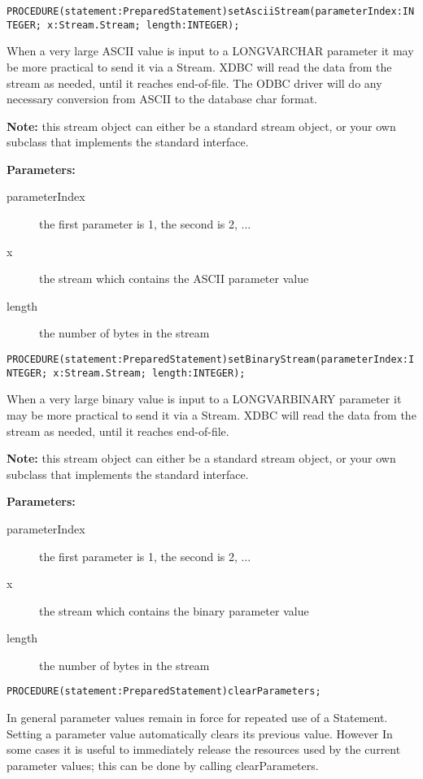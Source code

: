
\verb'PROCEDURE(statement:PreparedStatement)setAsciiStream(parameterIndex:INTEGER; x:Stream.Stream; length:INTEGER);'

When a very large ASCII value is input to a LONGVARCHAR parameter it may be more practical to send it via a Stream. XDBC will read the data from the stream as needed, until it reaches end-of-file. The ODBC driver will do any necessary conversion from ASCII to the database char format. 

{\bf Note: } this stream object can either be a standard stream object, or your own subclass that implements the standard interface. 

{\bf Parameters: }
\begin{description}
\item[parameterIndex] the first parameter is 1, the second is 2, ... 
\item[x] the stream which contains the ASCII parameter value 
\item[length] the number of bytes in the stream 
\end{description}



\verb'PROCEDURE(statement:PreparedStatement)setBinaryStream(parameterIndex:INTEGER; x:Stream.Stream; length:INTEGER);'

When a very large binary value is input to a LONGVARBINARY parameter it may be more practical to send it via a Stream. XDBC will read the data from the stream as needed, until it reaches end-of-file. 

{\bf Note: } this stream object can either be a standard stream object, or your own subclass that implements the standard interface. 

{\bf Parameters: }
\begin{description}
\item[parameterIndex] the first parameter is 1, the second is 2, ... 
\item[x] the  stream which contains the binary parameter value 
\item[length] the number of bytes in the stream 
\end{description}



\verb'PROCEDURE(statement:PreparedStatement)clearParameters;'

In general parameter values remain in force for repeated use of a Statement. Setting a parameter value automatically clears its previous value. However In some cases it is useful to immediately release the resources used by the current parameter values; this can be done by calling clearParameters. 


